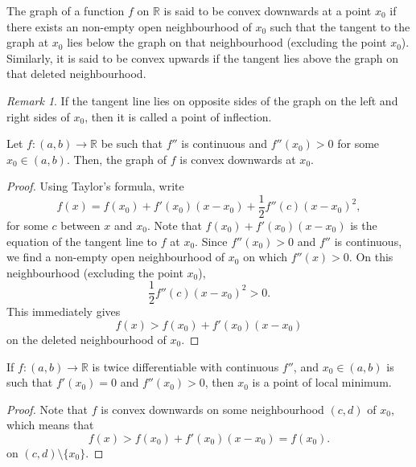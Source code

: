 \documentclass[11pt]{article}
\def\R{\mathbb{R}}
\theoremstyle{definition}
\theoremstyle{remark}
\newtheorem*{remark}{Remark}
\numberwithin{equation}{module}
\begin{document}
    \begin{definition}[Convexity]
        The graph of a function $f$ on $\R$ is said to be convex downwards at a
        point $x_0$ if there exists an non-empty open neighbourhood of $x_0$ such
        that the tangent to the graph at $x_0$ lies below the graph on that
        neighbourhood (excluding the point $x_0$). Similarly, it is said to be
        convex upwards if the tangent lies above the graph on that deleted
        neighbourhood.

        \begin{remark}
            If the tangent line lies on opposite sides of the graph on the left and
            right sides of $x_0$, then it is called a point of inflection.
        \end{remark}
    \end{definition}

    \begin{theorem}
        Let $f\colon (a, b) \to \R$ be such that $f''$ is continuous and $f''(x_0) >
        0$ for some $x_0 \in (a, b)$. Then, the graph of $f$ is convex downwards at
        $x_0$.
    \end{theorem}
    \begin{proof}
        Using Taylor's formula, write \[
            f(x) = f(x_0) + f'(x_0)(x - x_0) + \frac{1}{2}f''(c)(x - x_0)^2,
        \] for some $c$ between $x$ and $x_0$. Note that $f(x_0) + f'(x_0)(x - x_0)$
        is the equation of the tangent line to $f$ at $x_0$. Since $f''(x_0) > 0$
        and $f''$ is continuous, we find a non-empty open neighbourhood of $x_0$ on
        which $f''(x) > 0$. On this neighbourhood (excluding the point $x_0$), \[
            \frac{1}{2}f''(c)(x - x_0)^2 > 0.
        \] This immediately gives \[
            f(x) > f(x_0) + f'(x_0)(x - x_0)
        \] on the deleted neighbourhood of $x_0$.
    \end{proof}
    
    \begin{corollary}
        If $f\colon (a, b)\to \R$ is twice differentiable with continuous $f''$, and
        $x_0 \in (a, b)$ is such that $f'(x_0) = 0$ and $f''(x_0) > 0$, then $x_0$
        is a point of local minimum.
    \end{corollary}
    \begin{proof}
        Note that $f$ is convex downwards on some neighbourhood $(c, d)$ of $x_0$,
        which means that \[
            f(x) > f(x_0) + f'(x_0)(x - x_0) = f(x_0).
        \] on $(c, d)\setminus\{x_0\}$.
    \end{proof}
\end{document}
